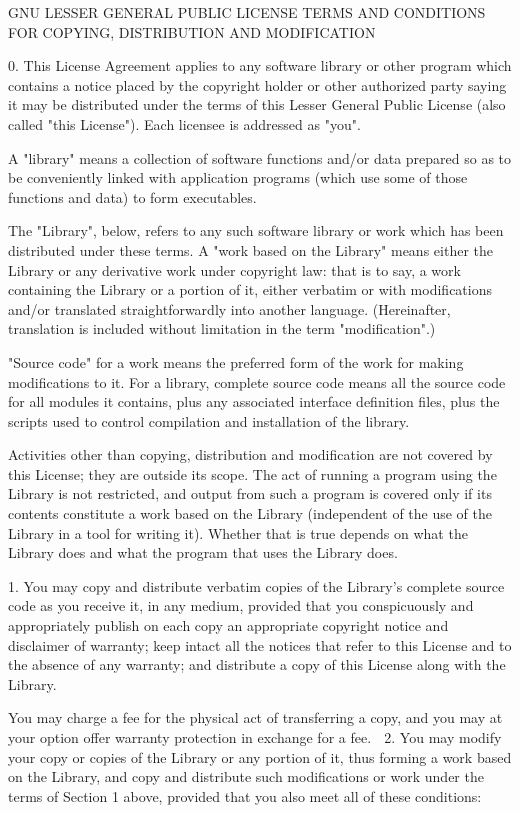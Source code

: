 \documentclass[a4paper,twoside,12pt]{book}
\begin{document}
		  GNU LESSER GENERAL PUBLIC LICENSE
   TERMS AND CONDITIONS FOR COPYING, DISTRIBUTION AND MODIFICATION

  0. This License Agreement applies to any software library or other
program which contains a notice placed by the copyright holder or
other authorized party saying it may be distributed under the terms of
this Lesser General Public License (also called "this License").
Each licensee is addressed as "you".

  A "library" means a collection of software functions and/or data
prepared so as to be conveniently linked with application programs
(which use some of those functions and data) to form executables.

  The "Library", below, refers to any such software library or work
which has been distributed under these terms.  A "work based on the
Library" means either the Library or any derivative work under
copyright law: that is to say, a work containing the Library or a
portion of it, either verbatim or with modifications and/or translated
straightforwardly into another language.  (Hereinafter, translation is
included without limitation in the term "modification".)

  "Source code" for a work means the preferred form of the work for
making modifications to it.  For a library, complete source code means
all the source code for all modules it contains, plus any associated
interface definition files, plus the scripts used to control compilation
and installation of the library.

  Activities other than copying, distribution and modification are not
covered by this License; they are outside its scope.  The act of
running a program using the Library is not restricted, and output from
such a program is covered only if its contents constitute a work based
on the Library (independent of the use of the Library in a tool for
writing it).  Whether that is true depends on what the Library does
and what the program that uses the Library does.

  1. You may copy and distribute verbatim copies of the Library's
complete source code as you receive it, in any medium, provided that
you conspicuously and appropriately publish on each copy an
appropriate copyright notice and disclaimer of warranty; keep intact
all the notices that refer to this License and to the absence of any
warranty; and distribute a copy of this License along with the
Library.

  You may charge a fee for the physical act of transferring a copy,
and you may at your option offer warranty protection in exchange for a
fee.

  2. You may modify your copy or copies of the Library or any portion
of it, thus forming a work based on the Library, and copy and
distribute such modifications or work under the terms of Section 1
above, provided that you also meet all of these conditions:
\end{document}
